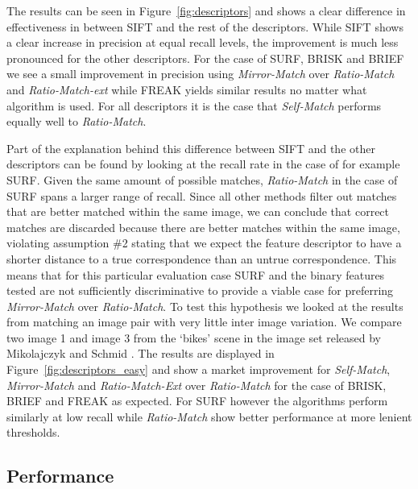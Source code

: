\documentclass[journal]{IEEEtran}
\begin{document}
The results can be seen in Figure~\ref{fig:descriptors} and shows a 
clear difference in effectiveness in between SIFT and the rest of the 
descriptors. While SIFT shows a clear increase in precision at equal 
recall levels, the improvement is much less pronounced for the other 
descriptors. For the case of SURF, BRISK and BRIEF we see a small 
improvement in precision using \emph{Mirror-Match} over 
\emph{Ratio-Match} and \emph{Ratio-Match-ext} while FREAK yields similar 
results no matter what algorithm is used. For all descriptors it is the 
case that \emph{Self-Match} performs equally well to \emph{Ratio-Match}.

Part of the explanation behind this difference between SIFT and the 
other descriptors can be found by looking at the recall rate in the case
of for example SURF\@. Given the same amount of possible matches, 
\emph{Ratio-Match} in the case of SURF spans a larger range of recall.  
Since all other methods filter out matches that are better matched 
within the same image, we can conclude that correct matches are
discarded because there are better matches within the same image, 
violating assumption \#2 stating that we expect the feature descriptor 
to have a shorter distance to a true correspondence than an untrue 
correspondence. This means that for this particular evaluation case SURF 
and the binary features tested are not sufficiently discriminative to 
provide a viable case for preferring \emph{Mirror-Match} over 
\emph{Ratio-Match}. To test this hypothesis we looked at the results 
from matching an image pair with very little inter image variation.  We 
compare two image 1 and image 3 from the `bikes' scene in the image set 
released by Mikolajczyk and Schmid \cite{mikolajczyk2005performance}.  
The results are displayed in Figure~\ref{fig:descriptors_easy} and show 
a market improvement for \emph{Self-Match}, \emph{Mirror-Match} and 
\emph{Ratio-Match-Ext} over \emph{Ratio-Match} for the case of BRISK, 
BRIEF and FREAK as expected. For SURF however the algorithms perform 
similarly at low recall while \emph{Ratio-Match} show better performance
at more lenient thresholds.

\subsection{Performance}
\end{document}
